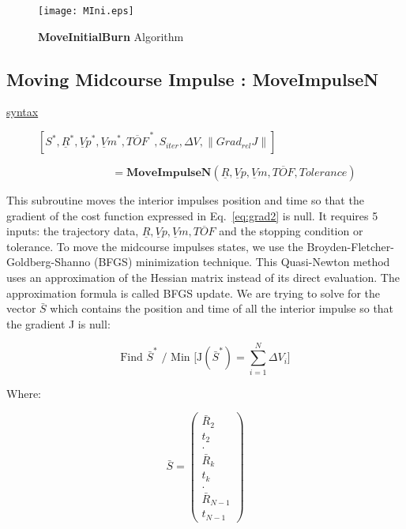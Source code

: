 \documentclass[12pt]{report}
\begin{document}
\begin{figure}
\centering
\texttt{[image: MIni.eps]}
\caption{\textbf{MoveInitialBurn} Algorithm} \label{MIni}
\end{figure}

\subsection{Moving Midcourse Impulse : MoveImpulseN}
\begin{description}
\item[\underline{syntax}]$[ S^{*}, \underline{R}^{*}, {\underline{V}p}^{*},{\underline{V}m}^{*},{\overline{TOF}}^{\,*},S_{iter},\Delta V, \|Grad_{rel} J\|]$
\item[]$\; \; \; \; \; \; \; \; \; \; \; \;\;\;\;\;\;\;\;\;\;\;\;\; = \textbf{MoveImpulseN}(\underline{R}, \underline{V}p,\underline{V}m,\overline{TOF},Tolerance)$
\end{description}
\noindent This subroutine moves the interior impulses position and
time so that the gradient of the cost function expressed in
Eq.~\ref{eq:grad2} is null. It requires 5 inputs: the trajectory
data, $\underline{R},
\underline{V}p,\underline{V}m,\overline{TOF}$ and the stopping
condition or tolerance. To move the midcourse impulses states, we
use the Broyden-Fletcher-Goldberg-Shanno (BFGS) minimization
technique. This Quasi-Newton method uses an approximation of the
Hessian matrix instead of its direct evaluation. The approximation
formula is called BFGS update. We are trying to solve for the
vector $\bar S$ which contains the position and time of all the
interior impulse so that the gradient J is null:

\begin{equation}
\mbox{Find $\bar S^{*}$  / Min [J}(\bar S^{*})= \sum_{i=1}^{N}
\Delta V_{i}] \label{eq:gradprob}
\end{equation}

Where:

\begin{equation}
\bar S = \left( \begin{array}{c}
\bar R_{2} \\
 t_{2} \\
. \\
\bar R_{k} \\
 t_{k} \\
. \\
\bar R_{N-1} \\
 t_{N-1} \end{array} \right)
\label{eq:S}
\end{equation}
\end{document}
